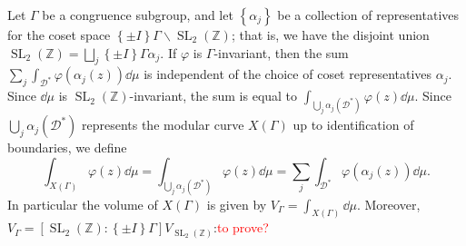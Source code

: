 \documentclass[10pt,leqno,twoside]{article}
\theoremstyle{plain}
\theoremstyle{definition}
\numberwithin{equation}{section}
\numberwithin{lem}{section}
\newcommand{\cbr}[1]{\left\{#1\right\}}
\newcommand{\textib}[1]{\textbf{\textit{#1\index{#1}}}} %
\DeclareMathOperator{\SL}{SL}
\newcommand{\slz}{\SL_2(\mathbb{Z})}
\newcommand{\tbd}{{\Huge\color{red}{\textib{TBD}}}}
\newcommand{\sai}[1]{\textcolor{red}{#1}}
\begin{document}
Let $\varGamma$ be a congruence subgroup, and let $\cbr{\alpha_j}$ be a collection of representatives for the coset space $\cbr{\pm I}\varGamma\backslash\slz$; that is, we have the disjoint union $\slz = \bigsqcup_j \cbr{\pm I}\varGamma \alpha_j$. If $\varphi$ is $\varGamma$-invariant, then the sum $\sum_j\int_{\mathcal D^\ast}\varphi(\alpha_j(z))\dd\mu$ is independent of the choice of coset representatives $\alpha_j$. Since $\dd\mu$ is $\slz$-invariant, the sum is equal to $\int_{\bigcup_j \alpha_j(\mathcal D^\ast)}\varphi(z)\dd\mu$. Since $\bigcup_j\alpha_j(\mathcal D^\ast)$ represents the modular curve $X(\varGamma)$ up to identification of boundaries, we define 
\[\int_{X(\varGamma)}\varphi(z)\dd\mu = \int_{\bigcup_j\alpha_j(\mathcal D^\ast)}\varphi(z)\dd\mu = \sum_j\int_{\mathcal D^\ast}\varphi(\alpha_j(z))\dd\mu.\] In particular the volume of $X(\varGamma)$ is given by $V_\varGamma = \int_{X(\varGamma)}\dd\mu$. Moreover, $V_\varGamma = [\slz : \cbr{\pm I}\varGamma]V_{\slz}$:\sai{to prove?}\tbd
\end{document}
